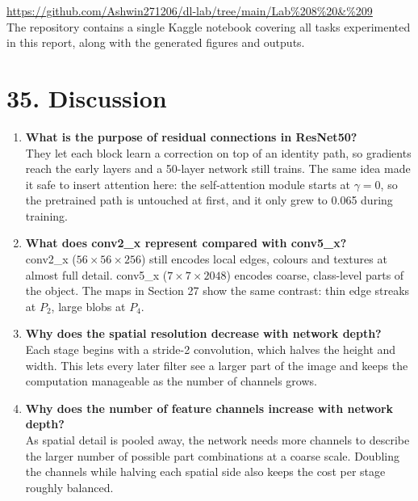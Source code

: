\documentclass[10pt]{article}
\begin{document}
    \hspace{25mm}  \url{https://github.com/Ashwin271206/dl-lab/tree/main/Lab%208%20&%209}\\

The repository contains a single Kaggle notebook covering all tasks experimented in this report, along with the generated figures and outputs.\\


\section*{35. Discussion}

\begin{enumerate}

\item \textbf{What is the purpose of residual connections in ResNet50?}\\
They let each block learn a correction on top of an identity path, so
gradients reach the early layers and a 50-layer network still trains. The same
idea made it safe to insert attention here: the self-attention module starts at
$\gamma=0$, so the pretrained path is untouched at first, and it only grew to
0.065 during training.

\item \textbf{What does conv2\_x represent compared with conv5\_x?}\\
conv2\_x ($56\times56\times256$) still encodes local edges, colours and
textures at almost full detail. conv5\_x ($7\times7\times2048$) encodes coarse,
class-level parts of the object. The maps in Section 27 show the same contrast:
thin edge streaks at $P_2$, large blobs at $P_4$.

\item \textbf{Why does the spatial resolution decrease with network depth?}\\
Each stage begins with a stride-2 convolution, which halves the height and
width. This lets every later filter see a larger part of the image and keeps the
computation manageable as the number of channels grows.

\item \textbf{Why does the number of feature channels increase with network depth?}\\
As spatial detail is pooled away, the network needs more channels to
describe the larger number of possible part combinations at a coarse scale.
Doubling the channels while halving each spatial side also keeps the cost per
stage roughly balanced.


\end{enumerate}
\end{document}
